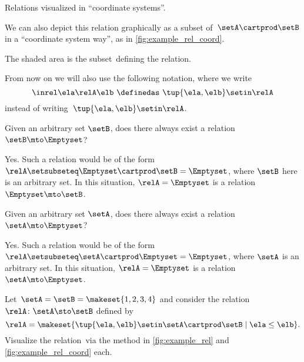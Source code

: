 \begin{marginfigure}
    \centering
    \caption{Relations visualized in ``coordinate systems''.}
    \label{fig:example_rel_coord}
\end{marginfigure}

We can also depict this relation graphically as a subset of~$\setA \cartprod \setB$ in a ``coordinate system way'', as in \cref{fig:example_rel_coord}.

The shaded area is the subset~\relA defining the relation.

\begin{remark}
    From now on we will also use the following notation, where we write
    \begin{equation}
        \inrel \ela \relA \elb \ \definedas\  \tup{\ela,\elb}\setin \relA
    \end{equation}
    instead of writing~$\tup{\ela,\elb}\setin \relA$.
\end{remark}

\begin{exercise}
    Given an arbitrary set $\setB$, does there always exist a relation $\setB \mto \Emptyset$?
\end{exercise}

\begin{solution}
    Yes.
    Such a relation would be of the form~$\relA \setsubseteq \Emptyset \cartprod \setB = \Emptyset$, where $\setB$ here is an arbitrary set.
    In this situation, $\relA=\Emptyset$ is a relation $\Emptyset \mto \setB$.
\end{solution}

\begin{exercise}
    Given an arbitrary set $\setA$, does there always exist a relation $\setA \mto \Emptyset$?
\end{exercise}

\begin{solution}
    Yes.
    Such a relation would be of the form~$\relA \setsubseteq \setA \cartprod \Emptyset = \Emptyset$, where $\setA$ is an arbitrary set.
    In this situation, $\relA=\Emptyset$ is a relation $\setA \mto \Emptyset$.
\end{solution}

\vfill
\begin{gradedexercise}
    \label{ex:visualize-leq-relation}
    Let~$\setA = \setB = \makeset{1, 2, 3, 4 }$ and consider the relation~$\relA \colon \setA \sto \setB$ defined by
    \begin{equation}
        \relA = \makeset{ \tup{\ela,\elb} \setin \setA \cartprod \setB \mid \ela \leq \elb }.
    \end{equation}
    Visualize the relation~\relA via the method in \cref{fig:example_rel} and \cref{fig:example_rel_coord} each.
\end{gradedexercise}

